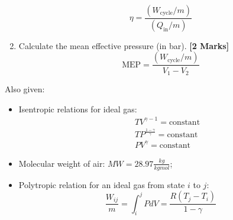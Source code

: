 \documentclass[calculator,steamtables,refrigeranttables]{exam}
\newcommand{\frc}{\displaystyle\frac}
\begin{document}
\begin{question}
\begin{enumerate}
\begin{displaymath}
\eta = \frc{\left(W_{\text{cycle}}/m\right)}{\left(Q_{\text{in}}/m\right)}
\end{displaymath}
\item Calculate the mean effective pressure (in bar). {\bf [2 Marks]}
\begin{displaymath}
\text{MEP} = \frc{\left(W_{\text{cycle}}/m\right)}{V_{1}-V_{2}}
\end{displaymath}
\end{enumerate} 
Also given:
\begin{itemize}
\item Isentropic relations for ideal gas:
\begin{eqnarray}
&& TV^{\gamma-1}=\text{constant} \nonumber \\
&& TP^{\frac{1-\gamma}{\gamma}}=\text{constant} \nonumber \\
&& PV^{\gamma}=\text{constant} \nonumber 
\end{eqnarray}
\item Molecular weight of air:  $MW=28.97\frc{kg}{kgmol}$;
\item Polytropic relation for an ideal gas from state $i$ to $j$:
\begin{displaymath}
\frc{W_{ij}}{m} = \int_{i}^{j}P dV = \frc{R\left(T_{j}-T_{i}\right)}{1-\gamma}
\end{displaymath}
\end{itemize}
\end{question}


\clearpage

\begin{question} \vspace{-2\baselineskip}

\end{question}

\clearpage


\begin{question}\vspace{-2\baselineskip}

\end{question}


\clearpage
\end{document}
